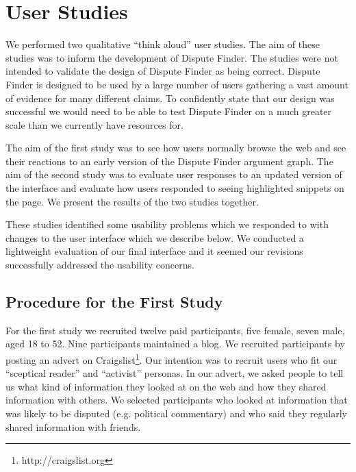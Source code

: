 \documentclass{www2010-submission}
\newcommand{\todo}[1]{}
\begin{document}
\section{User Studies}

We performed two qualitative ``think aloud'' user studies. The aim of these studies was to inform the development of Dispute Finder. The studies were not intended to validate the design of Dispute Finder as being correct. Dispute Finder is designed to be used by a large number of users gathering a vast amount of evidence for many different claims. To confidently state that our design was successful we would need to be able to test Dispute Finder on a much greater scale than we currently have resources for.

The aim of the first study was to see how users normally browse the web and see their reactions to an early version of the Dispute Finder argument graph. The aim of the second study was to evaluate user responses to an updated version of the interface and evaluate how users responded to seeing highlighted snippets on the page. We present the results of the two studies together.

These studies identified some usability problems which we responded to with changes to the user interface which we describe below. We conducted a lightweight evaluation of our final interface and it seemed our revisions successfully addressed the usability concerns.

\todo{Test with at least 4 people}
\todo{Say something about final informal evaluation}


\subsection{Procedure for the First Study}

For the first study we recruited twelve paid participants, five female, seven male, aged 18 to 52. Nine participants maintained a blog. We recruited participants by posting an advert on Craigslist\footnote{http://craigslist.org}.
Our intention was to recruit users who fit our ``sceptical reader'' and ``activist'' personas. In our advert, we asked people to tell us what kind of information they looked at on the web and how they shared information with others. We selected participants who looked at information that was likely to be disputed (e.g. political commentary) and who said they regularly shared information with friends. 
\end{document}
